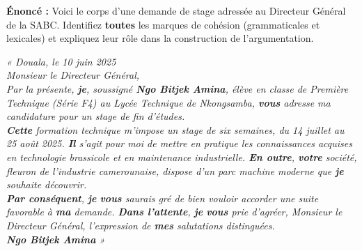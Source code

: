 \documentclass[11pt]{article}
\begin{document}
\begin{exoresolu}
\textbf{Énoncé :} Voici le corps d'une demande de stage adressée au Directeur Général de la SABC. Identifiez \textbf{toutes} les marques de cohésion (grammaticales et lexicales) et expliquez leur rôle dans la construction de l'argumentation.

\emph{« Douala, le 10 juin 2025\\
Monsieur le Directeur Général,\\
Par la présente, \textbf{je}, soussigné \textbf{Ngo Bitjek Amina}, élève en classe de Première Technique (Série F4) au Lycée Technique de Nkongsamba, \textbf{vous} adresse ma candidature pour un stage de fin d'études.\\
\textbf{Cette} formation technique m'impose un stage de six semaines, du 14 juillet au 25 août 2025. \textbf{Il} s'agit pour moi de mettre en pratique les connaissances acquises en technologie brassicole et en maintenance industrielle. \textbf{En outre}, \textbf{votre} société, fleuron de l'industrie camerounaise, dispose d'un parc machine moderne que \textbf{je} souhaite découvrir.\\
\textbf{Par conséquent}, \textbf{je} \textbf{vous} saurais gré de bien vouloir accorder une suite favorable à \textbf{ma} demande. \textbf{Dans l'attente}, \textbf{je} \textbf{vous} prie d'agréer, Monsieur le Directeur Général, l'expression de \textbf{mes} salutations distinguées.\\
\textbf{Ngo Bitjek Amina} »}


\end{exoresolu}
\end{document}
